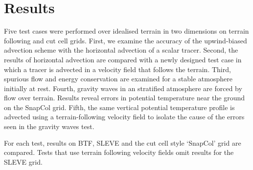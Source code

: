 \chapter{Results}
\label{sec:results}

Five test cases were performed over idealised terrain in two dimensions on terrain following and cut cell grids.  First, we examine the accuracy of the upwind-biased advection scheme with the horizontal advection of a scalar tracer.  Second, the results of horizontal advection are compared with a newly designed test case in which a tracer is advected in a velocity field that follows the terrain.  Third, spurious flow and energy conservation are examined for a stable atmosphere initially at rest.  Fourth, gravity waves in an stratified atmosphere are forced by flow over terrain.  Results reveal errors in potential temperature near the ground on the SnapCol grid.  Fifth, the same vertical potential temperature profile is advected using a terrain-following velocity field to isolate the cause of the errors seen in the gravity waves test.  

For each test, results on BTF, SLEVE and the cut cell style `SnapCol' grid are compared.  Tests that use terrain following velocity fields omit results for the SLEVE grid.






